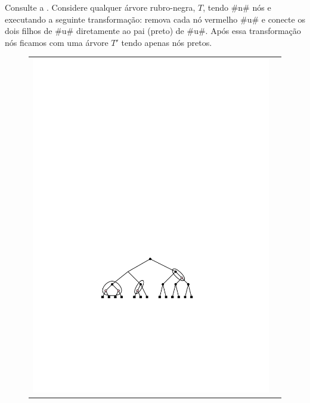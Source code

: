 Consulte a .
Considere qualquer árvore rubro-negra, $T$, tendo #n# nós e executando a
seguinte transformação: remova cada nó vermelho #u# e conecte os dois
filhos de #u# diretamente ao pai (preto) de #u#. Após essa transformação
nós ficamos com uma árvore $T'$ tendo apenas nós pretos.
\begin{figure}
	\begin{center}
		\begin{tabular}{cc}
			\includegraphics[scale=0.90909]{figs/24rb-3} \\

\end{tabular}
\end{center}
\end{figure}

